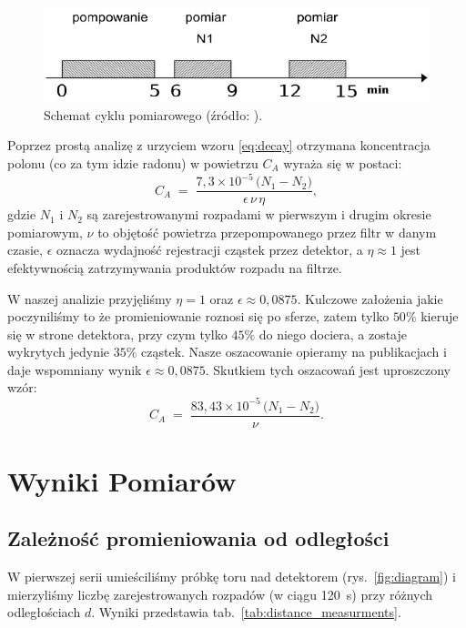 \documentclass[12pt]{article}
\begin{document}
\begin{figure}[H]
	\centering
	\includegraphics[scale=0.7]{cycle}
	\caption{Schemat cyklu pomiarowego (źródło: \cite{skrypt}).}
	\label{fig:cycle}
\end{figure}

Poprzez prostą analizę z urzyciem wzoru \eqref{eq:decay} otrzymana koncentracja polonu (co za tym idzie radonu) w powietrzu \(C_A\) wyraża się w postaci:
\[
    C_A \;=\; \frac{7{,}3 \times 10^{-5}\,\bigl(N_1 - N_2\bigr)}{\epsilon\,\nu\,\eta},
\]
gdzie \(N_1\) i \(N_2\) są zarejestrowanymi rozpadami w pierwszym i drugim okresie pomiarowym, \(\nu\) to objętość powietrza przepompowanego przez filtr w danym czasie, \(\epsilon\) oznacza wydajność rejestracji cząstek przez detektor, a \(\eta\approx 1\) jest efektywnością zatrzymywania produktów rozpadu na filtrze.  

W naszej analizie przyjęliśmy \(\eta=1\) oraz \(\epsilon \approx 0{,}0875\). Kulczowe założenia jakie poczyniliśmy to że promieniowanie roznosi się po sferze, zatem tylko \(50\%\) kieruje się w strone detektora, przy czym tylko \(45\%\) do niego dociera, a zostaje wykrytych jedynie $35\%$ cząstek.
Nasze oszacowanie opieramy na publikacjach \cite{scynt,alpha_range} i daje wspomniany wynik \(\epsilon \approx 0{,}0875\). Skutkiem tych oszacowań jest uproszczony wzór:
\begin{equation}
    C_A \;=\; \frac{83{,}43 \times 10^{-5}\,\bigl(N_1 - N_2\bigr)}{\nu}.
    \label{eq:markov}
\end{equation}

\section{Wyniki Pomiarów}

\subsection{Zależność promieniowania od odległości}
W pierwszej serii umieściliśmy próbkę toru nad detektorem (rys.~\ref{fig:diagram}) i mierzyliśmy liczbę zarejestrowanych rozpadów (w ciągu 120~s) przy różnych odległościach \(d\). Wyniki przedstawia tab.~\ref{tab:distance_measurments}.
\end{document}
